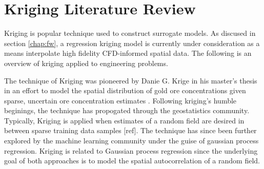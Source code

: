 \section{Kriging Literature Review}

Kriging is popular technique used to construct surrogate models.  As discused in section \ref{chap:fw}, a regression kriging model is currently under consideration as a means interpolate high fidelity CFD-informed spatial data. The following is an overview of kriging applied to engineering problems.

The technique of Kriging was pioneered by Danie G. Krige in his master's thesis in an effort to model the spatial distribution of gold ore concentrations given sparse, uncertain ore concentration estimates \cite{krige51}. Following kriging's humble beginings, the technique has propogated through the geostatistics community. Typically, Kriging is applied when estimates of a random field are desired in between sparse training data samples [ref].  The technique has since been further explored by the machine learning community under the guise of gaussian process regression.
Kriging is related to Gaussian process regression since the underlying goal of both approaches is to model the spatial autocorrelation of a random field.  
